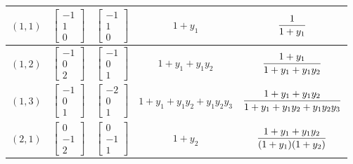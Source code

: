 \documentclass[pdftex]{sigma}%
\numberwithin{equation}{section}
\begin{document}
\begin{Example}
\begin{table}[t!]
\begin{tabular}{c|c|c|c|c}
\hline
$(1,1)$ & $\begin{bmatrix}-1\\[-1ex]1\\[-1ex]0 \end{bmatrix}$ & $\begin{bmatrix}-1\\[-1ex]1\\[-1ex]0 \end{bmatrix}$ & $1+y_1$&$\dfrac{1}{1+y_1}\vphantom{\begin{bmatrix}1\\[-.5ex]0\\[-.5ex]0 \end{bmatrix}}$\\
\hline
$(1,2)$ & $\begin{bmatrix}-1\\[-1ex]0\\[-1ex]2 \end{bmatrix}$ & $\begin{bmatrix}-1\\[-1ex]0\\[-1ex]1 \end{bmatrix}$ & $1+y_1+y_1y_2$ & $\dfrac{1+y_1}{1+y_1+y_1y_2}\vphantom{\begin{bmatrix}1\\[-.5ex]0\\[-.5ex]0 \end{bmatrix}}$\\
\hline
$(1,3)$ & $\begin{bmatrix}-1\\[-1ex]0\\[-1ex]1 \end{bmatrix}$ & $\begin{bmatrix}-2\\[-1ex]0\\[-1ex]1 \end{bmatrix}$ & $1+y_1+y_1y_2+y_1y_2y_3$ & $\dfrac{1+y_1+y_1y_2}{1+y_1+y_1y_2+y_1y_2y_3}\vphantom{\begin{bmatrix}1\\[-.5ex]0\\[-.5ex]0 \end{bmatrix}}$\\
\hline
$(2,1)$ & $\begin{bmatrix}0\\[-1ex]-1\\[-1ex]2 \end{bmatrix}$& $\begin{bmatrix}0\\[-1ex]-1\\[-1ex]1 \end{bmatrix}$&$1+y_2$ & $\dfrac{1+y_1+y_1y_2}{(1+y_1)(1+y_2)}\vphantom{\begin{bmatrix}1\\[-.5ex]0\\[-.5ex]0 \end{bmatrix}}$\\

\end{tabular}
\end{table}
\end{Example}
\end{document}
